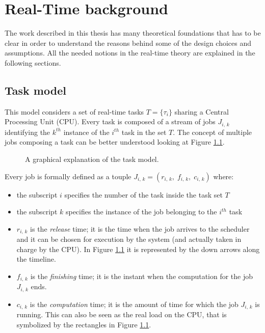 \chapter{Real-Time background} \label{cha:rt_background}

The work described in this thesis has many theoretical foundations that has to be
clear in order to understand the reasons behind some of the design choices and
assumptions. All the needed notions in the real-time theory are explained in the
following sections.


\section{Task model} \label{sec:task_model}
This model considers a set of real-time tasks \( T = \{\tau_{i}\} \)
sharing a Central Processing Unit (CPU). Every task
is composed of a stream of jobs \( J_{i,\,k} \) identifying the \( k^{th} \)
instance of the \( i^{th} \) task in the set \( T \). The concept of multiple
jobs composing a task can be better understood looking at Figure \ref{img:task_model}.
\begin{figure}[!htb]
    \caption{A graphical explanation of the task model.}
    \label{img:task_model}
\end{figure}

Every job is formally defined as a touple
\( J_{i,\,k} = \left(r_{i,\,k}, \;f_{i,\,k}, \;c_{i,\,k}\right) \) where:
\begin{itemize}
    \item the subscript \( i \) specifies the number of the task inside the task 
        set \( T \)
    \item the subscript \( k \) specifies the instance of the job belonging to
        the \( i^{th} \) task
    \item \( r_{i,\,k} \) is the \emph{release} time; it is the time when
        the job arrives to the scheduler and it can be chosen for execution
        by the system (and actually taken in charge by the CPU). In Figure
        \ref{img:task_model} it is represented by the down arrows along the
        timeline.
    \item \( f_{i,\,k} \) is the \emph{finishing} time; it is the instant when
        the computation for the job \( J_{i,\,k} \) ends.
    \item \( c_{i,\,k} \) is the \emph{computation} time; it is the amount of
        time for which the job \( J_{i,\,k} \) is running. This can also be seen
        as the real load on the CPU, that is symbolized by the rectangles
        in Figure \ref{img:task_model}.
\end{itemize} 

